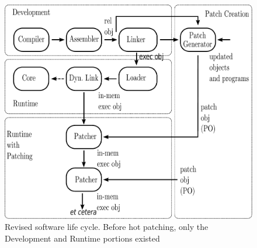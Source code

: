 \begin{figure}[ht]
\begin{center}
\includegraphics[scale=0.5]{software_lifecycle.pdf}
\end{center}
\caption{{\small Revised software life cycle. Before hot patching, only
    the Development and Runtime portions existed}}
\label{fig:lifecycle}
\end{figure}

